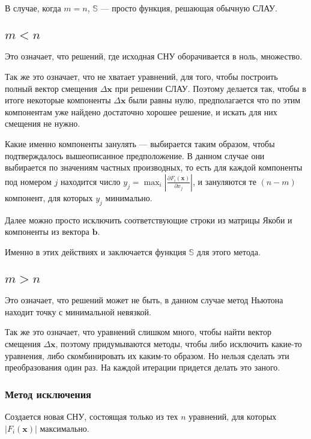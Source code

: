 \documentclass[12pt, a4paper]{article}
\begin{document}
В случае, когда $m = n$, $\mathbb{S}$ --- просто функция, решающая обычную СЛАУ.

\subsection{$m < n$}

Это означает, что решений, где исходная СНУ оборачивается в ноль, множество.

Так же это означает, что не хватает уравнений, для того, чтобы построить полный вектор смещения $\Delta\mathbf{x}$ при решении СЛАУ. Поэтому делается так, чтобы в итоге некоторые компоненты $\Delta\mathbf{x}$ были равны нулю, предполагается что по этим компонентам уже найдено достаточно хорошее решение, и искать для них смещения не нужно. 

Какие именно компоненты занулять --- выбирается таким образом, чтобы подтверждалось вышеописанное предположение. В данном случае они выбирается по значениям частных производных, то есть для каждой компоненты под номером $j$ находится число $y_j = \max_i \left|\frac{\partial F_i(\mathbf{x})}{\partial x_j}\right|$, и зануляются те $(n-m)$ компонент, для которых $y_j$ минимально.

Далее можно просто исключить соответствующие строки из матрицы Якоби и компоненты из вектора $\mathbf{b}$.

Именно в этих действиях и заключается функция $\mathbb{S}$ для этого метода.

\subsection{$m > n$}	

Это означает, что решений может не быть, в данном случае метод Ньютона находит точку с минимальной невязкой.

Так же это означает, что уравнений слишком много, чтобы найти вектор смещения $\Delta\mathbf{x}$, поэтому придумываются методы, чтобы либо исключить какие-то уравнения, либо скомбинировать их каким-то образом. Но нельзя сделать эти преобразования один раз. На каждой итерации придется делать это заного.

\subsubsection{Метод исключения}

Создается новая СНУ, состоящая только из тех $n$ уравнений, для которых $|F_i(\mathbf{x})|$ максимально.
\end{document}
